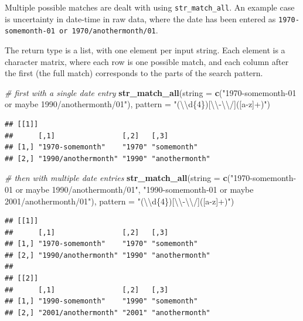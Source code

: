 \documentclass[]{book}
\newenvironment{Shaded}{}{}
\newcommand{\CharTok}[1]{\textcolor[rgb]{0.25,0.44,0.63}{#1}}
\newcommand{\CommentTok}[1]{\textcolor[rgb]{0.38,0.63,0.69}{\textit{#1}}}
\newcommand{\DataTypeTok}[1]{\textcolor[rgb]{0.56,0.13,0.00}{#1}}
\newcommand{\KeywordTok}[1]{\textcolor[rgb]{0.00,0.44,0.13}{\textbf{#1}}}
\newcommand{\NormalTok}[1]{#1}
\newcommand{\StringTok}[1]{\textcolor[rgb]{0.25,0.44,0.63}{#1}}
\begin{document}
Multiple possible matches are dealt with using \texttt{str\_match\_all}. An example case is uncertainty in date-time in raw data, where the date has been entered as \texttt{1970-somemonth-01\ or\ 1970/anothermonth/01}.

The return type is a list, with one element per input string. Each element is a character matrix, where each row is one possible match, and each column after the first (the full match) corresponds to the parts of the search pattern.

\begin{Shaded}
\begin{Highlighting}[]
\CommentTok{# first with a single date entry}
\KeywordTok{str_match_all}\NormalTok{(}\DataTypeTok{string =} \KeywordTok{c}\NormalTok{(}\StringTok{"1970-somemonth-01 or maybe 1990/anothermonth/01"}\NormalTok{),}
          \DataTypeTok{pattern =} \StringTok{"(}\CharTok{\textbackslash{}\textbackslash{}}\StringTok{d\{4\})[}\CharTok{\textbackslash{}\textbackslash{}}\StringTok{-}\CharTok{\textbackslash{}\textbackslash{}}\StringTok{/]([a-z]+)"}\NormalTok{)}
\end{Highlighting}
\end{Shaded}

\begin{verbatim}
## [[1]]
##      [,1]                [,2]   [,3]          
## [1,] "1970-somemonth"    "1970" "somemonth"   
## [2,] "1990/anothermonth" "1990" "anothermonth"
\end{verbatim}

\begin{Shaded}
\begin{Highlighting}[]
\CommentTok{# then with multiple date entries}
\KeywordTok{str_match_all}\NormalTok{(}\DataTypeTok{string =} \KeywordTok{c}\NormalTok{(}\StringTok{"1970-somemonth-01 or maybe 1990/anothermonth/01"}\NormalTok{,}
                         \StringTok{"1990-somemonth-01 or maybe 2001/anothermonth/01"}\NormalTok{),}
          \DataTypeTok{pattern =} \StringTok{"(}\CharTok{\textbackslash{}\textbackslash{}}\StringTok{d\{4\})[}\CharTok{\textbackslash{}\textbackslash{}}\StringTok{-}\CharTok{\textbackslash{}\textbackslash{}}\StringTok{/]([a-z]+)"}\NormalTok{)}
\end{Highlighting}
\end{Shaded}

\begin{verbatim}
## [[1]]
##      [,1]                [,2]   [,3]          
## [1,] "1970-somemonth"    "1970" "somemonth"   
## [2,] "1990/anothermonth" "1990" "anothermonth"
## 
## [[2]]
##      [,1]                [,2]   [,3]          
## [1,] "1990-somemonth"    "1990" "somemonth"   
## [2,] "2001/anothermonth" "2001" "anothermonth"
\end{verbatim}
\end{document}
